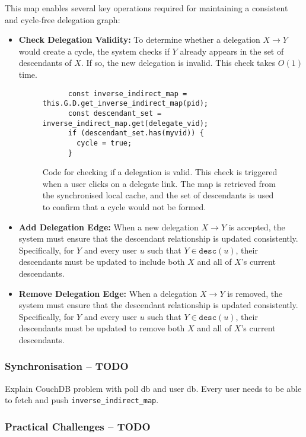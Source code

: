 This map enables several key operations required for maintaining a consistent and cycle-free delegation graph:

\begin{itemize}
  \item \textbf{Check Delegation Validity:} To determine whether a delegation \(X \!\to\! Y\) would create a cycle, the system checks if \(Y\) already appears in the set of descendants of \(X\). If so, the new delegation is invalid. This check takes \(O(1)\) time.
  \begin{figure}[H]
    \centering
    \begin{verbatim}
      const inverse_indirect_map = this.G.D.get_inverse_indirect_map(pid);
      const descendant_set = inverse_indirect_map.get(delegate_vid);
      if (descendant_set.has(myvid)) {
        cycle = true;
      }
    \end{verbatim}
    \caption{Code for checking if a delegation is valid. This check is triggered when a user clicks on a delegate link. The map is retrieved from the synchronised local cache, and the set of descendants is used to confirm that a cycle would not be formed.}
  \end{figure}

  \item \textbf{Add Delegation Edge:} When a new delegation \(X \to Y\) is accepted, the system must ensure that the descendant relationship is updated consistently. Specifically, for $Y$ and every user \(u\) such that \(Y \in \texttt{desc}(u)\), their descendants must be updated to include both \(X\) and all of \(X\)'s current descendants.

  \item \textbf{Remove Delegation Edge:} When a delegation \(X \!\to\! Y\) is removed, the system must ensure that the descendant relationship is updated consistently. Specifically, for $Y$ and every user \(u\) such that \(Y \in \texttt{desc}(u)\), their descendants must be updated to remove both \(X\) and all of \(X\)'s current descendants.
\end{itemize}

\subsubsection{Synchronisation -- TODO}
Explain CouchDB problem with poll db and user db. Every user needs to be able to fetch and push \verb|inverse_indirect_map|.

\subsubsection{Practical Challenges -- TODO}

